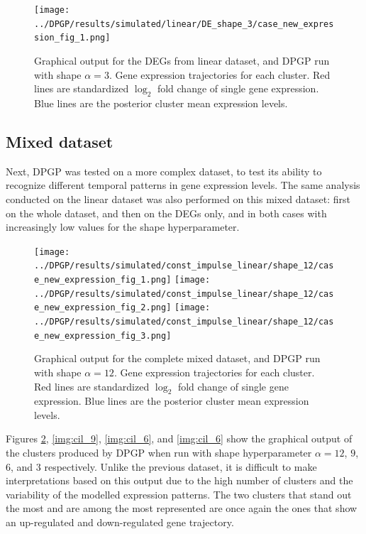 \begin{figure}[!hp]
    \centering
    \texttt{[image: ../DPGP/results/simulated/linear/DE\_shape\_3/case\_new\_expression\_fig\_1.png]}
    \caption[DPGP output for DEG linear dataset, shape 3]{Graphical output for the DEGs from linear dataset, and DPGP run with shape $\alpha=3$. Gene expression trajectories for each cluster. Red lines are standardized $\log_{2}$ fold change of single gene expression. Blue lines are the posterior cluster mean expression levels.}\label{img:de_lin_3}
\end{figure}

\subsection{Mixed dataset}
Next, DPGP was tested on a more complex dataset, to test its ability to recognize different temporal patterns in gene expression levels. The same analysis conducted on the linear dataset was also performed on this mixed dataset: first on the whole dataset, and then on the DEGs only, and in both cases with increasingly low values for the shape hyperparameter.

\begin{figure}[!hp]
    \centering
    \texttt{[image: ../DPGP/results/simulated/const\_impulse\_linear/shape\_12/case\_new\_expression\_fig\_1.png]}
    \texttt{[image: ../DPGP/results/simulated/const\_impulse\_linear/shape\_12/case\_new\_expression\_fig\_2.png]}
    \texttt{[image: ../DPGP/results/simulated/const\_impulse\_linear/shape\_12/case\_new\_expression\_fig\_3.png]}
    \caption[DPGP output for mixed dataset, shape 12]{Graphical output for the complete mixed dataset, and DPGP run with shape $\alpha=12$. Gene expression trajectories for each cluster. Red lines are standardized $\log_{2}$ fold change of single gene expression. Blue lines are the posterior cluster mean expression levels.}\label{img:cil_12}
\end{figure}

Figures \ref{img:cil_12}, \ref{img:cil_9}, \ref{img:cil_6}, and \ref{img:cil_6} show the graphical output of the clusters produced by DPGP when run with shape hyperparameter $\alpha=12$, $9$, $6$, and $3$ respectively. Unlike the previous dataset, it is difficult to make interpretations based on this output due to the high number of clusters and the variability of the modelled expression patterns. The two clusters that stand out the most and are among the most represented are once again the ones that show an up-regulated and down-regulated gene trajectory.

